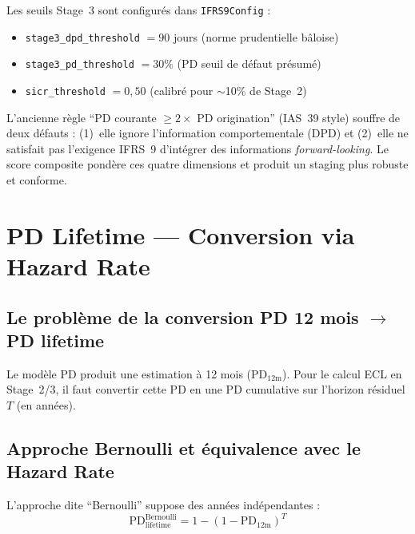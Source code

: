 \documentclass[12pt,a4paper]{article}
\begin{document}
Les seuils Stage~3 sont configur\'es dans \texttt{IFRS9Config} :

\begin{itemize}
    \item \texttt{stage3\_dpd\_threshold} $= 90$ jours (norme prudentielle b\^aloise)
    \item \texttt{stage3\_pd\_threshold} $= 30\%$ (PD seuil de d\'efaut pr\'esum\'e)
    \item \texttt{sicr\_threshold} $= 0{,}50$ (calibr\'e pour $\sim$10\% de Stage~2)
\end{itemize}

\begin{interpretbox}
L'ancienne r\`egle ``PD courante $\geq 2\times$ PD origination'' (IAS~39 style) souffre de deux d\'efauts : (1)~elle ignore l'information comportementale (DPD) et (2)~elle ne satisfait pas l'exigence IFRS~9 d'int\'egrer des informations \textit{forward-looking}. Le score composite pond\`ere ces quatre dimensions et produit un staging plus robuste et conforme.
\end{interpretbox}

\newpage
\section{PD Lifetime --- Conversion via Hazard Rate}
\label{sec:pd_lifetime}

\subsection{Le probl\`eme de la conversion PD 12 mois $\to$ PD lifetime}

Le mod\`ele PD produit une estimation \`a 12 mois ($\text{PD}_{12\text{m}}$). Pour le calcul ECL en Stage~2/3, il faut convertir cette PD en une PD cumulative sur l'horizon r\'esiduel $T$ (en ann\'ees).

\subsection{Approche Bernoulli et \'equivalence avec le Hazard Rate}

L'approche dite ``Bernoulli'' suppose des ann\'ees ind\'ependantes :
\begin{equation}
\text{PD}_{\text{lifetime}}^{\text{Bernoulli}} = 1 - (1 - \text{PD}_{12\text{m}})^T
\end{equation}
\end{document}
